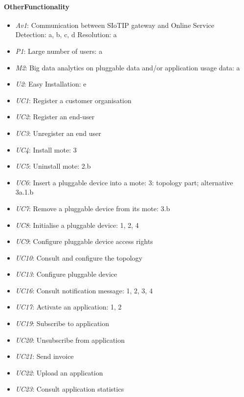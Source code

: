     \paragraph{OtherFunctionality}
        \begin{itemize}
            \item \emph{Av1}: Communication between SIoTIP gateway and Online Service \\
                               Detection: a, b, c, d
                               Resolution: a
           	\item \emph{P1}: Large number of users: a
            \item \emph{M2}: Big data analytics on pluggable data and/or application usage data: a
            \item \emph{U2}: Easy Installation: e
            \item \emph{UC1}: Register a customer organisation
            \item \emph{UC2}: Register an end-user
            \item \emph{UC3}: Unregister an end user
            \item \emph{UC4}: Install mote: 3
            \item \emph{UC5}: Uninstall mote: 2.b
            \item \emph{UC6}: Insert a pluggable device into a mote: 3: topology part; alternative 3a.1.b
            \item \emph{UC7}: Remove a pluggable device from its mote: 3.b
            \item \emph{UC8}: Initialise a pluggable device: 1, 2, 4
            \item \emph{UC9}: Configure pluggable device access rights
            \item \emph{UC10}: Consult and configure the topology
            \item \emph{UC13}: Configure pluggable device
            \item \emph{UC16}: Consult notification message: 1, 2, 3, 4
            \item \emph{UC17}: Activate an application: 1, 2
            \item \emph{UC19}: Subscribe to application
            \item \emph{UC20}: Unsubscribe from application
            \item \emph{UC21}: Send invoice
            \item \emph{UC22}: Upload an application
            \item \emph{UC23}: Consult application statistics

\end{itemize}
